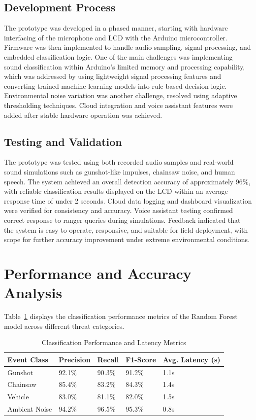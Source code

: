 \documentclass[11pt,a4paper,oneside]{report}
\begin{document}
\subsection{Development Process}
The prototype was developed in a phased manner, starting with hardware interfacing of the microphone and LCD with the Arduino microcontroller. Firmware was then implemented to handle audio sampling, signal processing, and embedded classification logic. One of the main challenges was implementing sound classification within Arduino's limited memory and processing capability, which was addressed by using lightweight signal processing features and converting trained machine learning models into rule-based decision logic. Environmental noise variation was another challenge, resolved using adaptive thresholding techniques. Cloud integration and voice assistant features were added after stable hardware operation was achieved.

\subsection{Testing and Validation}
The prototype was tested using both recorded audio samples and real-world sound simulations such as gunshot-like impulses, chainsaw noise, and human speech. The system achieved an overall detection accuracy of approximately 96\%, with reliable classification results displayed on the LCD within an average response time of under 2 seconds. Cloud data logging and dashboard visualization were verified for consistency and accuracy. Voice assistant testing confirmed correct response to ranger queries during simulations. Feedback indicated that the system is easy to operate, responsive, and suitable for field deployment, with scope for further accuracy improvement under extreme environmental conditions.

\section{Performance and Accuracy Analysis}
Table~\ref{tab:results_summary} displays the classification performance metrics of the Random Forest model across different threat categories.

\begin{table}[H]
\centering
\caption{Classification Performance and Latency Metrics}
\label{tab:results_summary}
\begin{tabular}{lllll}
\toprule
\textbf{Event Class} & \textbf{Precision} & \textbf{Recall} & \textbf{F1-Score} & \textbf{Avg. Latency (s)} \\
\midrule
Gunshot & 92.1\% & 90.3\% & 91.2\% & 1.1s \\
Chainsaw & 85.4\% & 83.2\% & 84.3\% & 1.4s \\
Vehicle & 83.0\% & 81.1\% & 82.0\% & 1.5s \\
Ambient Noise & 94.2\% & 96.5\% & 95.3\% & 0.8s \\
\bottomrule
\end{tabular}
\end{table}
\end{document}
